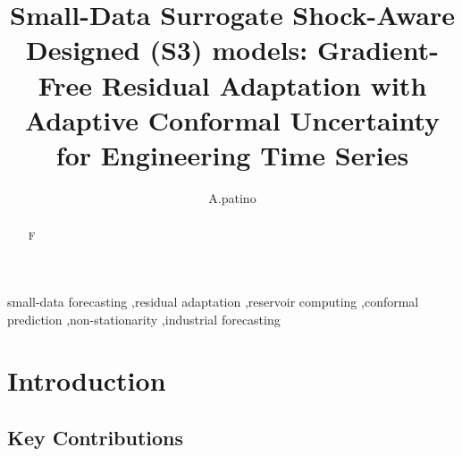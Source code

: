 \documentclass[review,number,sort&compress]{elsarticle}
\begin{document}
\begin{frontmatter}

\title{Small-Data Surrogate Shock-Aware Designed (S3) models: Gradient-Free Residual Adaptation with Adaptive Conformal Uncertainty for Engineering Time Series}
\author{A.patino}

\begin{abstract}
F
\end{abstract}

\begin{keyword}
small-data forecasting \sep residual adaptation \sep reservoir computing \sep conformal prediction \sep non-stationarity \sep industrial forecasting
\end{keyword}

\end{frontmatter}

\section{Introduction}




\subsection{Key Contributions}
\end{document}
